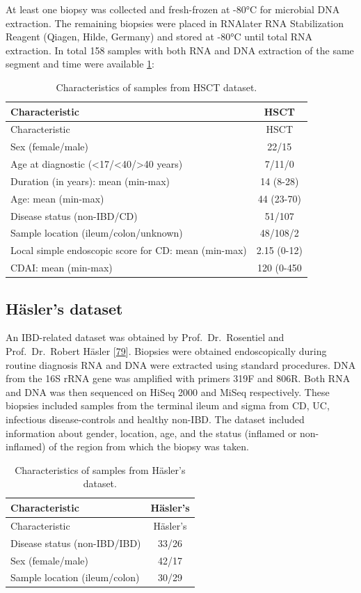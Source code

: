 \documentclass[
  12pt,
  a4paper,
  twoside,
  openright]{book}
\begin{document}
At least one biopsy was collected and fresh-frozen at -80°C for microbial DNA extraction.
The remaining biopsies were placed in RNAlater RNA Stabilization Reagent (Qiagen, Hilde, Germany) and stored at -80°C until total RNA extraction.
In total 158 samples with both RNA and DNA extraction of the same segment and time were available \ref{tab:HSCT}:

\begin{longtable}[]{@{}lc@{}}
\caption{\label{tab:HSCT} Characteristics of samples from HSCT dataset.}\tabularnewline
\toprule
Characteristic & HSCT \\
\midrule
\endfirsthead
\toprule
Characteristic & HSCT \\
\midrule
\endhead
Sex (female/male) & 22/15 \\
Age at diagnostic (\textless17/\textless40/\textgreater40 years) & 7/11/0 \\
Duration (in years): mean (min-max) & 14 (8-28) \\
Age: mean (min-max) & 44 (23-70) \\
Disease status (non-IBD/CD) & 51/107 \\
Sample location (ileum/colon/unknown) & 48/108/2 \\
Local simple endoscopic score for CD: mean (min-max) & 2.15 (0-12) \\
CDAI: mean (min-max) & 120 (0-450 \\
\bottomrule
\end{longtable}

\hypertarget{methods-hasler}{%
\subsection{Häsler's dataset}\label{methods-hasler}}

An IBD-related dataset was obtained by Prof.~Dr.~Rosentiel and Prof.~Dr.~Robert Häsler {[}\protect\hyperlink{ref-hasler_uncoupling_2016}{79}{]}.
Biopsies were obtained endoscopically during routine diagnosis RNA and DNA were extracted using standard procedures.
DNA from the 16S rRNA gene was amplified with primers 319F and 806R.
Both RNA and DNA was then sequenced on HiSeq 2000 and MiSeq respectively.
These biopsies included samples from the terminal ileum and sigma from CD, UC, infectious disease-controls and healthy non-IBD.
The dataset included information about gender, location, age, and the status (inflamed or non-inflamed) of the region from which the biopsy was taken.

\begin{longtable}[]{@{}lc@{}}
\caption{\label{tab:Hasler} Characteristics of samples from Häsler's dataset.}\tabularnewline
\toprule
Characteristic & Häsler's \\
\midrule
\endfirsthead
\toprule
Characteristic & Häsler's \\
\midrule
\endhead
Disease status (non-IBD/IBD) & 33/26 \\
Sex (female/male) & 42/17 \\
Sample location (ileum/colon) & 30/29 \\
\bottomrule
\end{longtable}
\end{document}
